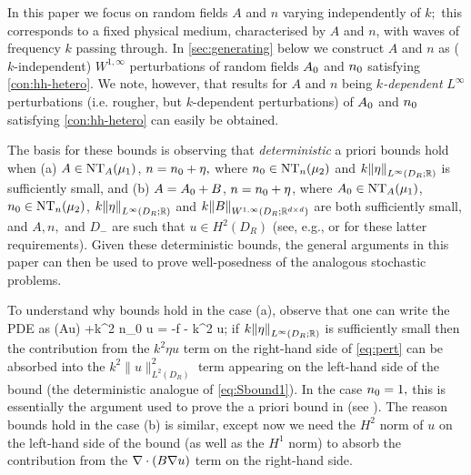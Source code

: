 \label{rem:kdep}
In this paper we focus on random fields $A$ and $n$ varying independently of $k;$ this corresponds to a fixed physical
medium, characterised by $A$ and $n$, with waves of frequency $k$ passing through.
In \cref{sec:generating} below we construct $A$ and $n$ as ($k$-independent) $W^{1,\infty}$ perturbations of random fields $A_{0}$ and $n_{0}$ satisfying \cref{con:hh-hetero}.
We note, however, that results for $A$ and $n$ being
\emph{$k$-dependent} $L^\infty$ perturbations (i.e. rougher, but $k$-dependent perturbations) of $A_{0}$
and $n_{0}$ satisfying \cref{con:hh-hetero} can easily be obtained.

The basis for these bounds is observing that \emph{deterministic} a priori bounds hold when
(a) $A\in \NTA{\mu_1}$, $n = n_{0} + \eta,$ where $\nz \in \NTn{\mu_2}$
and $k\NLiDRRR{\eta}$ is sufficiently small, and
(b) $A=A_{0}+B$, $n=n_{0}+\eta$, where $\Az\in \NTA{\mu_1}$, $\nz \in
\NTn{\mu_2}$, $k\NLiDRRR{\eta}$ and $k \NWoiDRRRdtd{B}$ are
both sufficiently small, and $A, n,$ and $D_-$ are such that $u\in
H^2(D_R)$ (see, e.g., \cite[Theorem 4.18(i)]{Mc:00} or \cite[Theorems
2.3.3.2 and 2.4.2.5]{Gr:85} for these latter requirements). Given these deterministic bounds, the general arguments in this paper
can then be used to prove well-posedness of the analogous stochastic
problems.

To understand why bounds hold in the case (a), observe that one can
write the PDE as
\beq\label{eq:pert}
\nabla \cdot(A\grad u) +k^2 n_0 u = -f - k^2 \eta u;
\eeq
if $k\NLiDRRR{\eta}$ is sufficiently small then the contribution from
the $k^2 \eta u$ term on the right-hand side of \eqref{eq:pert} can be
absorbed into the $k^2\|u\|^2_{L^2(D_R)}$ term appearing on the left-hand
side of the bound (the deterministic analogue of \eqref{eq:Sbound1}).
In the case $n_{0}=1,$ this is essentially the argument used to prove the
a priori bound in \cite[Theorem 2.4]{FeLiLo:15} (see \cite[Remark
2.15]{GrPeSp:19}).
The reason bounds hold in the case (b) is similar, except now we need
the $H^2$ norm of $u$ on the left-hand side of the bound (as well as
the $H^1$ norm) to absorb the contribution from the $\nabla \cdot
(B\nabla u)$ term on the right-hand side.
\ere
